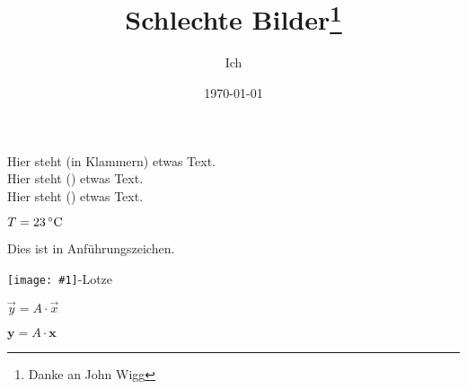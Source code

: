 \documentclass[a4paper, 10pt,onecolumn, captions=tableheading]{scrartcl}
\title{Schlechte Bilder\thanks{Danke an John Wigg}}
\author{Ich} %
\date{\today}
\begin{document}
	
\newlength{\abstand}	
Hier steht (in Klammern) etwas Text.\\
\settowidth{\abstand}{in Klammern}
Hier steht (\hspace{\abstand}) etwas Text.\\
Hier steht (\phantom{in Klammern}) etwas Text.


\newcommand{\Celsius}[1]{#1\,$^\circ\mathrm{C}$}
$T=23 \Celsius$

\newcommand{\q}[1]{\glqq #1 \grqq}
\q{Dies ist in Anführungszeichen.}


\newlength{\fh}
\newcommand{\textimage}[1]{\texttt{[image: \#1]}}
\textimage{lotze.jpg}-Lotze

$\vec{y} = A\cdot\vec{x}$

\renewcommand{\vec}[1]{\boldsymbol{#1}}

$\vec{y} = A\cdot\vec{x}$
\end{document}
